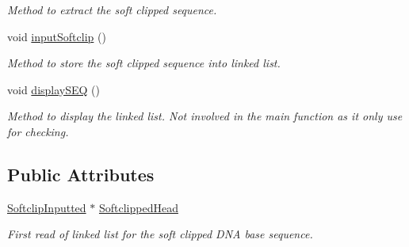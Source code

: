 \begin{DoxyCompactItemize}
\begin{DoxyCompactList}\small\item\em Method to extract the soft clipped sequence. \end{DoxyCompactList}\item 
\hypertarget{class_input_s_e_q_a5f8cd26f6acf9be5ae112eb8837bfe3f}{void \hyperlink{class_input_s_e_q_a5f8cd26f6acf9be5ae112eb8837bfe3f}{input\+Softclip} ()}\label{class_input_s_e_q_a5f8cd26f6acf9be5ae112eb8837bfe3f}

\begin{DoxyCompactList}\small\item\em Method to store the soft clipped sequence into linked list. \end{DoxyCompactList}\item 
\hypertarget{class_input_s_e_q_ab605f4a1972d6e019673d6c00df36263}{void \hyperlink{class_input_s_e_q_ab605f4a1972d6e019673d6c00df36263}{display\+S\+E\+Q} ()}\label{class_input_s_e_q_ab605f4a1972d6e019673d6c00df36263}

\begin{DoxyCompactList}\small\item\em Method to display the linked list. Not involved in the main function as it only use for checking. \end{DoxyCompactList}\end{DoxyCompactItemize}
\subsection*{Public Attributes}
\begin{DoxyCompactItemize}
\item 
\hypertarget{class_input_s_e_q_a3b429d8245896c4ceff6d8f295bc135c}{\hyperlink{struct_softclip_inputted}{Softclip\+Inputted} $\ast$ \hyperlink{class_input_s_e_q_a3b429d8245896c4ceff6d8f295bc135c}{Softclipped\+Head}}\label{class_input_s_e_q_a3b429d8245896c4ceff6d8f295bc135c}

\begin{DoxyCompactList}\small\item\em First read of linked list for the soft clipped D\+N\+A base sequence. \end{DoxyCompactList}\end{DoxyCompactItemize}
